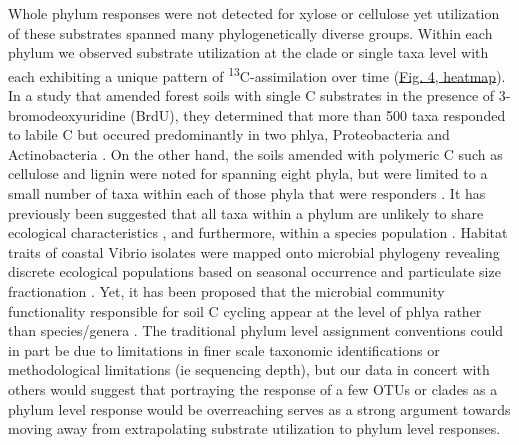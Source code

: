 Whole phylum responses were not detected for xylose or cellulose yet utilization of these substrates spanned many phylogenetically diverse groups. Within each phylum we observed substrate utilization at the clade or single taxa level with each exhibiting a unique pattern of \textsuperscript{13}C-assimilation over time (\href{https://authorea.com/users/3537/articles/3612/master/file/figures/bacteria_tree/bacteria_tree.png}{Fig. 4, heatmap}). In a study that amended forest soils with single C substrates in the presence of 3-bromodeoxyuridine (BrdU), they determined that more than 500 taxa responded to labile C but occured predominantly in two phlya, Proteobacteria and Actinobacteria \cite{Goldfarb_2011}. On the other hand, the soils amended with polymeric C such as cellulose and lignin were noted for spanning eight phyla, but were limited to a small number of taxa within each of those phyla that were responders \cite{Goldfarb_2011}. It has previously been suggested that all taxa within a phylum are unlikely to share ecological characteristics \cite{Fierer_2007}, and furthermore, within a species population \cite{Choudoir_2012,Preheim_2011,Hunt_2008}. Habitat traits of coastal Vibrio isolates were mapped onto microbial phylogeny revealing discrete ecological populations based on seasonal occurrence and particulate size fractionation \cite{Preheim_2011,Hunt_2008}. Yet, it has been proposed that the microbial community functionality responsible for soil C cycling appear at the level of phlya rather than species/genera \cite{Schimel_2012}. The traditional phylum level assignment conventions could in part be due to limitations in finer scale taxonomic identifications or methodological limitations (ie sequencing depth), but our data in concert with others \cite{Goldfarb_2011,Fierer_2007,Choudoir_2012,Preheim_2011,Hunt_2008} would suggest that portraying the response of a few OTUs or clades as a phylum level response would be overreaching serves as a strong argument towards moving away from extrapolating substrate utilization to phylum level responses.

